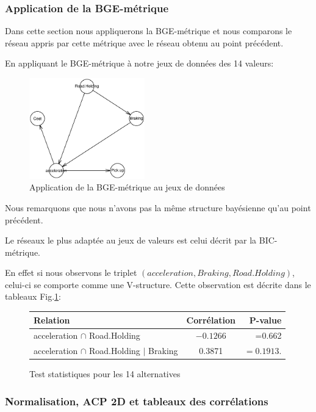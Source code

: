\documentclass[a4paper]{article}
\begin{document}
\subsubsection{Application de la BGE-métrique}
Dans cette section nous appliquerons la BGE-métrique et nous comparons le réseau appris par cette métrique avec le réseau obtenu au point précédent.

En appliquant le BGE-métrique à notre jeux de données des 14 valeurs:
 
\begin{figure}[H] 
    \center
    \includegraphics[width=5cm]{THIERRY_IMAGE_BGE.eps} 
    \caption{Application de la BGE-métrique au jeux de données} 
\end{figure} 

Nous remarquons que nous n'avons pas la même structure bayésienne qu'au point précédent.

 Le réseaux le plus adaptée au jeux de valeurs est celui décrit par la BIC-métrique.

En effet si nous observons  le triplet $(acceleration,Braking,Road.Holding)$, celui-ci se comporte comme une  V-structure.
Cette observation est décrite dans le tableaux Fig.\ref{fig2_vstruct}:

\begin{figure}[H]
\begin{center}
\begin{tabular}{|l|c|r|}
  \hline
  Relation & Corrélation & P-value \\
  \hline
acceleration $\cap$ Road.Holding & $-0.1266$&=0.662 \\
acceleration $\cap$ Road.Holding $|$ Braking& 0.3871&$=0.1913$.\\ 
\hline
\end{tabular}
\end{center}
\caption{Test statistiques pour les 14 alternatives }
\label{fig2_vstruct}
\end{figure}




\subsubsection{Normalisation, ACP 2D et tableaux des corrélations}
\end{document}
